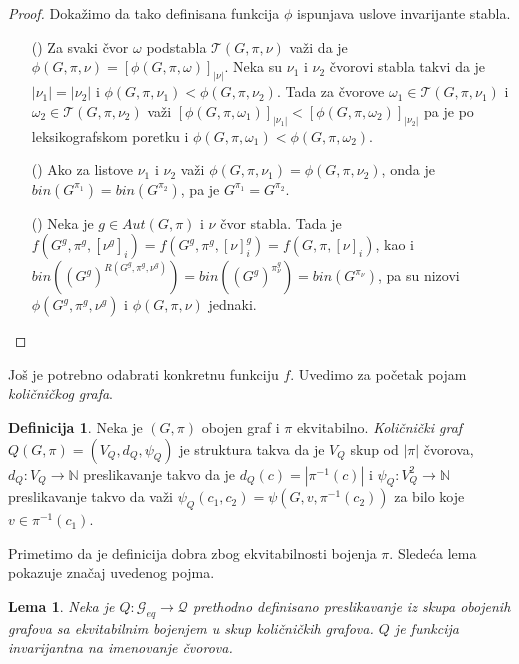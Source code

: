 \documentclass[12pt,oneside]{memoir}
\newtheorem{lemma}{Lema}
\theoremstyle{definition}
\newtheorem*{definition}{Definicija}
\begin{document}
  \begin{proof}
	  Dokažimo da tako definisana funkcija $\phi$ ispunjava uslove invarijante stabla.
	  \begin{itemize}
		  \item[(\phi1)] Za svaki čvor $\omega$ podstabla $\mathcal{T}(G, \pi,
			  \nu)$ važi da je $\phi(G, \pi, \nu) = [\phi(G, \pi,
			  \omega)]_{|\nu|}$. Neka su $\nu_1$ i $\nu_2$ čvorovi stabla takvi
			  da je $|\nu_1|=|\nu_2|$ i $\phi(G, \pi, \nu_1) < \phi(G, \pi,
			  \nu_2)$. Tada za čvorove $\omega_1 \in \mathcal{T}(G, \pi,
			  \nu_1)$ i $\omega_2 \in \mathcal{T}(G, \pi, \nu_2)$ važi
			  $[\phi(G, \pi, \omega_1)]_{|\nu_1|} < [\phi(G, \pi,
			  \omega_2)]_{|\nu_2|}$ pa je po leksikografskom poretku i $\phi(G,
			  \pi, \omega_1) < \phi(G, \pi, \omega_2)$.
		  \item[(\phi2)] Ako za listove $\nu_1$ i $\nu_2$ važi $\phi(G, \pi,
			  \nu_1) = \phi(G, \pi, \nu_2)$, onda je $bin(G^{\pi_1}) =
			  bin(G^{\pi_2})$, pa je $G^{\pi_1} = G^{\pi_2}$.
		  \item[(\phi3)] Neka je $g \in Aut(G, \pi)$ i $\nu$ čvor stabla. Tada
			  je $f(G^g, \pi^g, [\nu^g]_i) = f(G^g, \pi^g, [\nu]_i^g) = f(G,
			  \pi, [\nu]_i)$, kao i $bin((G^g)^{R(G^g, \pi^g, \nu^g)}) =
			  bin((G^g)^{\pi_\nu^g}) = bin(G^{\pi_\nu})$, pa su nizovi
			  $\phi(G^g, \pi^g, \nu^g)$ i $\phi(G, \pi, \nu)$ jednaki.
	  \end{itemize}
  \end{proof}

  Još je potrebno odabrati konkretnu funkciju $f$. Uvedimo za početak pojam
  \emph{količničkog grafa}.

  \begin{definition}
	  Neka je $(G, \pi)$ obojen graf i $\pi$ ekvitabilno. \emph{Količnički
	  graf} $Q(G, \pi) = (V_Q, d_Q, \psi_Q)$ je struktura takva da je $V_Q$
	  skup od $|\pi|$ čvorova, $d_Q : V_Q \to \mathbb{N}$ preslikavanje takvo
	  da je $d_Q(c) = |\pi^{-1}(c)|$ i $\psi_Q : V_Q^2 \to \mathbb{N}$
	  preslikavanje takvo da važi $\psi_Q(c_1, c_2) = \psi(G, v,
	  \pi^{-1}(c_2))$ za bilo koje $v \in \pi^{-1}(c_1)$.
  \end{definition}

  Primetimo da je definicija dobra zbog ekvitabilnosti bojenja $\pi$. Sledeća
  lema pokazuje značaj uvedenog pojma.

  \begin{lemma}
	  Neka je $Q : \mathcal{G}_{eq} \to \mathcal{Q}$ prethodno definisano
	  preslikavanje iz skupa obojenih grafova sa ekvitabilnim bojenjem u skup
	  količničkih grafova. $Q$ je funkcija invarijantna na imenovanje čvorova.
  \end{lemma}
\end{document}
